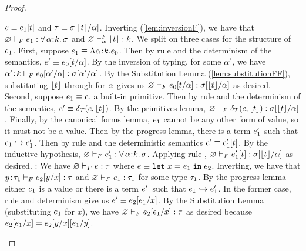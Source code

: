 \begin{proof}
\begin{itemize}
  $\sexpr \equiv \tyapp{\sexpr_1}{\stype}$ and
  $\sftype \equiv \subst{\sigma}{\tvar}{\forgetreft{\stype}}$. 
  Inverting (\ref{lem:inversionF}), we have that 
  $\hasftype{\varnothing}{\sexpr_1}{\polytype{\tvar}{\skind}{\sigma}}$
  and $\isWFFT{\varnothing}{\forgetreft{\stype}}{\skind}$.
  We split on three cases for the structure of $\sexpr_1$.
  First, suppose $\sexpr_1 \equiv \tabs{\tvar}{\skind}{\sexpr_0}$.
  Then by rule \eTAppAbs and the determinism of the semantics, 
  $\sexpr' \equiv \subst{\sexpr_0}{\tvar}{\stype}$.
  By the inversion of typing, for some $\tvar'$, we have
  $\hasftype{\bind{\tvar'}{\skind}}{\subst{\sexpr_0}{\tvar}{\tvar'}}
  {\subst{\sigma}{\tvar}{\tvar'}}$.
  By the Substitution Lemma (\ref{lem:substitutionFF}), 
  substituting $\forgetreft{\stype}$ 
  through for $\tvar$  gives us 
  $\hasftype{\varnothing}{\subst{\sexpr_0}{\tvar}{\stype}}{\subst{\sigma}{\tvar}{\forgetreft{\stype}}}$ as desired.
  Second, suppose $\sexpr_1 \equiv \sconst$, a built-in primitive.
  Then by rule \eTPrim and the determinism of the semantics, 
  $\sexpr' \equiv \delta_T(\sconst,\forgetreft{\stype})$. By the primitives lemma,
  $\hasftype{\varnothing}{\delta_T(\sconst,\forgetreft{\stype})}{\subst{\sigma}{\tvar}{\forgetreft{\stype}}}$.
  Finally, by the canonical forms lemma, $\sexpr_1$ cannot be any other
  form of value, so it must not be a value. Then by the progress lemma,
  there is a term $\sexpr'_1$ such that $\sexpr_1 \step \sexpr'_1$. 
  Then by rule \eTApp and the deterministic semantics
  $\sexpr' \equiv \tyapp{\sexpr'_1}{\stype}$.  By the inductive hypothesis,
  $\hasftype{\varnothing}{\sexpr'_1}{\polytype{\tvar}{\skind}{\sigma}}$.
  Applying rule \fTApp, 
  $\hasftype{\varnothing}{\tyapp{\sexpr'_1}{\stype}}{\subst{\sigma}{\tvar}{\forgetreft{\stype}}}$
  as desired.
  \pfcase{\fLet}: We have 
  $\hasftype{\varnothing}{\sexpr}{\sftype}$ where
  $\sexpr \equiv \eletin{x}{\sexpr_1}{\sexpr_2}$. Inverting,
  we have that 
  $\hasftype{\bind{y}{\sftype_1}}{\subst{\sexpr_2}{x}{y}}{\sftype}$
  and $\hasftype{\varnothing}{\sexpr_1}{\sftype_1}$
  for some type $\sftype_1$. 
  By the progress lemma either $\sexpr_1$ is a value
  or there is a term $\sexpr'_1$ such that $\sexpr_1 \step \sexpr'_1$.
  In the former case, rule \eLetV and determinism give us
  $\sexpr' \equiv \subst{\sexpr_2}{x}{\sexpr_1}$.
  By the Substitution Lemma (substituting $\sexpr_1$ for $x$), 
  we have $\hasftype{\varnothing}{\subst{\sexpr_2}{x}{\sexpr_1}}{\sftype}$
  as desired because 
  $\subst{\sexpr_2}{x}{\sexpr_1} = \subst{\subst{\sexpr_2}{x}{y}}{y}{\sexpr_1}$.

\end{itemize}
\end{proof}
